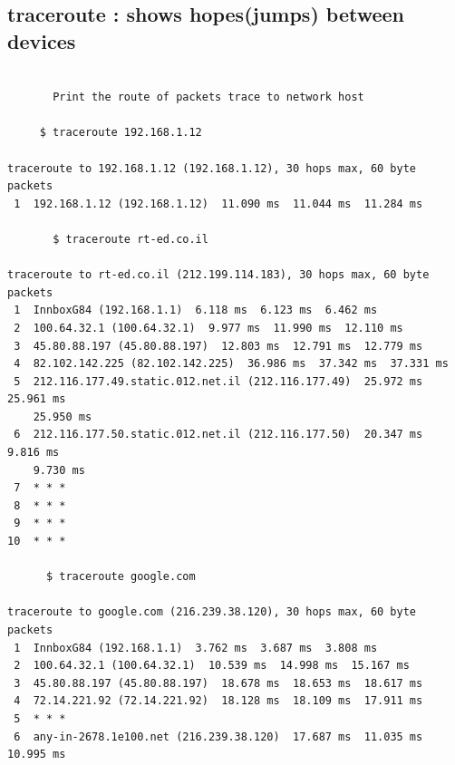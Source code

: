 \documentclass[a4paper,12pt]{article}
\begin{document}
\subsection{traceroute : shows hopes(jumps) between devices}
\begin{verbatim}
       
       Print the route of packets trace to network host

     $ traceroute 192.168.1.12
     
traceroute to 192.168.1.12 (192.168.1.12), 30 hops max, 60 byte packets
 1  192.168.1.12 (192.168.1.12)  11.090 ms  11.044 ms  11.284 ms       
       
       $ traceroute rt-ed.co.il
       
traceroute to rt-ed.co.il (212.199.114.183), 30 hops max, 60 byte packets
 1  InnboxG84 (192.168.1.1)  6.118 ms  6.123 ms  6.462 ms
 2  100.64.32.1 (100.64.32.1)  9.977 ms  11.990 ms  12.110 ms
 3  45.80.88.197 (45.80.88.197)  12.803 ms  12.791 ms  12.779 ms
 4  82.102.142.225 (82.102.142.225)  36.986 ms  37.342 ms  37.331 ms
 5  212.116.177.49.static.012.net.il (212.116.177.49)  25.972 ms  25.961 ms 
    25.950 ms
 6  212.116.177.50.static.012.net.il (212.116.177.50)  20.347 ms  9.816 ms
    9.730 ms
 7  * * *
 8  * * *
 9  * * *
10  * * *

      $ traceroute google.com
      
traceroute to google.com (216.239.38.120), 30 hops max, 60 byte packets
 1  InnboxG84 (192.168.1.1)  3.762 ms  3.687 ms  3.808 ms
 2  100.64.32.1 (100.64.32.1)  10.539 ms  14.998 ms  15.167 ms
 3  45.80.88.197 (45.80.88.197)  18.678 ms  18.653 ms  18.617 ms
 4  72.14.221.92 (72.14.221.92)  18.128 ms  18.109 ms  17.911 ms
 5  * * *
 6  any-in-2678.1e100.net (216.239.38.120)  17.687 ms  11.035 ms  10.995 ms


\end{verbatim}
\end{document}
